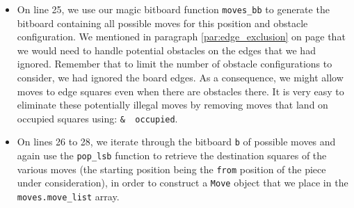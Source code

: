 \documentclass[12pt,a4paper,twoside,openright]{book}
\begin{document}
\begin{itemize}
\begin{itemize}
\item On line 25, we use our magic bitboard function \texttt{moves_bb} to generate the bitboard containing all possible moves for this position and obstacle configuration. We mentioned in paragraph \ref{par:edge_exclusion} on page \pageref{par:edge_exclusion} that we would need to handle potential obstacles on the edges that we had ignored. Remember that to limit the number of obstacle configurations to consider, we had ignored the board edges. As a consequence, we might allow moves to edge squares even when there are obstacles there. It is very easy to eliminate these potentially illegal moves by removing moves that land on occupied squares using: \texttt{& ~occupied}.

\item On lines 26 to 28, we iterate through the bitboard \texttt{b} of possible moves and again use the \texttt{pop_lsb} function to retrieve the destination squares of the various moves (the starting position being the \texttt{from} position of the piece under consideration), in order to construct a \texttt{Move} object that we place in the \texttt{moves.move_list} array.

\end{itemize}


\end{itemize}
\end{document}
